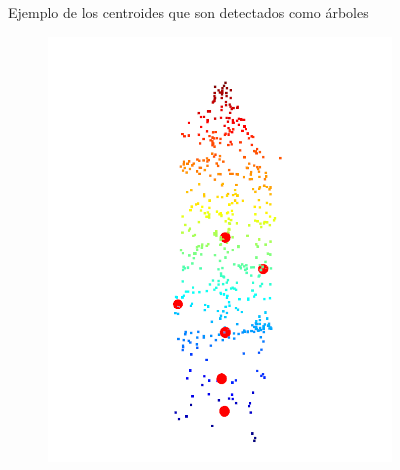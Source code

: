 \begin{figure}
\begin{subfigure}{0.5\textwidth}
  \end{subfigure}
 \caption{Ejemplo de los centroides que son detectados como árboles}
  \label{fig:centroidesAna}
\end{figure}

\begin{figure}
  \begin{subfigure}{0.5\textwidth}
    \centering
    \includegraphics[width=0.8\linewidth]{imaxes/resdetec1fallido.png}
  \end{subfigure}
  \begin{subfigure}{0.5\textwidth}
    \centering

\end{subfigure}
\end{figure}
